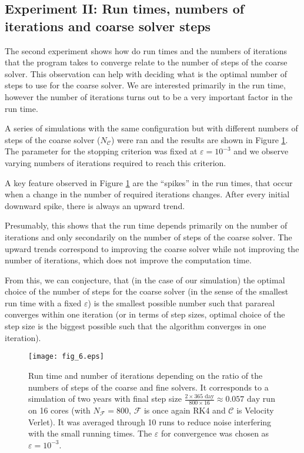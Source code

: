 \documentclass[conference]{IEEEtran}
\begin{document}
\subsection{Experiment II: Run times, numbers of iterations and coarse solver steps}

The second experiment shows how do run times and the numbers of iterations that the program takes to converge relate to the number of steps of the coarse solver. This observation can help with deciding what is the optimal number of steps to use for the coarse solver. We are interested primarily in the run time, however the number of iterations turns out to be a very important factor in the run time.

A series of simulations with the same configuration but with different numbers of steps of the coarse solver ($N_\mathcal{C}$) were ran and the results are shown in Figure \ref{timetest}. The parameter for the stopping criterion was fixed at $\varepsilon = 10^{-3}$ and we observe varying numbers of iterations required to reach this criterion.

A key feature observed in Figure \ref{timetest} are the ``spikes'' in the run times, that occur when a change in the number of required iterations changes. After every initial downward spike, there is always an upward trend. 

Presumably, this shows that the run time depends primarily on the number of iterations and only secondarily on the number of steps of the coarse solver. The upward trends correspond to improving the coarse solver while not improving the number of iterations, which does not improve the computation time.

From this, we can conjecture, that (in the case of our simulation) the optimal choice of the number of steps for the coarse solver (in the sense of the smallest run time with a fixed $\varepsilon$) is the smallest possible number such that parareal converges within one iteration (or in terms of step sizes, optimal choice of the step size is the biggest possible such that the algorithm converges in one iteration).

\begin{figure}[htbp]
\centerline{\texttt{[image: fig\_6.eps]}}
\caption{Run time and number of iterations depending on the ratio of the numbers of steps of the coarse and fine solvers. It corresponds to a simulation of two years with final step size $\frac{2\times365\text{ day}}{800\times 16} \approx 0.057\text{ day}$ run on 16 cores (with $N_\mathcal{F} = 800$, $\mathcal{F}$ is once again RK4 and $\mathcal{C}$ is Velocity Verlet). It was averaged through 10 runs to reduce noise interfering with the small running times. The $\varepsilon$ for convergence was chosen as $\varepsilon = 10^{-3}$.}
\label{timetest}
\end{figure}
\end{document}
